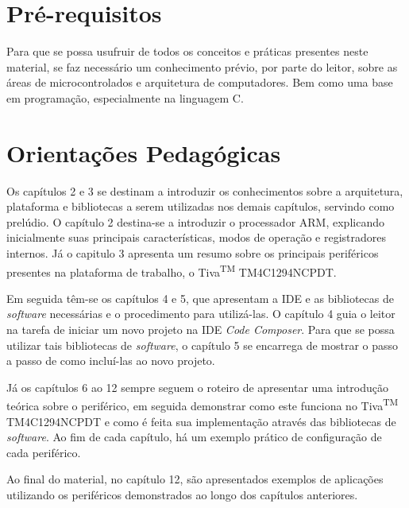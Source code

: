 \section{Pré-requisitos}
Para que se possa usufruir de todos os conceitos e práticas presentes neste material, se faz necessário um conhecimento prévio, por parte do leitor, sobre as áreas de microcontrolados e arquitetura de computadores. Bem como uma base em programação, especialmente na linguagem C.

\section{Orientações Pedagógicas}

Os capítulos 2 e 3 se destinam a introduzir os conhecimentos sobre a arquitetura, plataforma e bibliotecas a serem utilizadas nos demais capítulos, servindo como prelúdio. O capítulo 2  destina-se a introduzir o processador ARM, explicando inicialmente suas principais características, modos de operação e registradores internos. Já o capitulo 3 apresenta um resumo sobre os principais periféricos presentes na plataforma de trabalho, o Tiva\textsuperscript{TM} TM4C1294NCPDT.

Em seguida têm-se os capítulos 4 e 5, que apresentam a IDE e as bibliotecas de \emph{software} necessárias e o procedimento para utilizá-las. O capítulo 4 guia o leitor na tarefa de  iniciar um novo projeto na IDE \emph{Code Composer}. Para que se possa utilizar tais bibliotecas de \emph{software}, o capítulo 5 se encarrega de mostrar o passo a passo de como incluí-las ao novo projeto.

Já os capítulos 6 ao 12 sempre seguem o roteiro de apresentar uma introdução teórica sobre o periférico, em seguida demonstrar como este funciona no Tiva\textsuperscript{TM} TM4C1294NCPDT e como é feita sua implementação através das bibliotecas de \emph{software}. Ao fim de cada capítulo, há um exemplo prático de configuração de cada periférico. 

Ao final do material, no capítulo 12, são apresentados exemplos de aplicações utilizando os  periféricos demonstrados ao longo dos capítulos anteriores.  